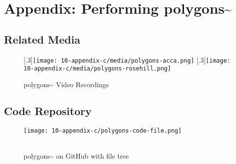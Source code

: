 \chapter{Appendix: Performing polygons\textasciitilde{}}

\section{Related Media}
\begin{figure}[!ht]
    \centering
    [.3\linewidth]{\texttt{[image: 10-appendix-c/media/polygons-acca.png]}}
    \hspace*{2cm}
    [.3\linewidth]{\texttt{[image: 10-appendix-c/media/polygons-rosehill.png]}}
    \caption*{polygons\textasciitilde{} Video Recordings}
\end{figure}
\clearpage


\section{Code Repository}
\begin{figure}[!ht]
    \texttt{[image: 10-appendix-c/polygons-code-file.png]}
    \caption*{ \\ polygons\textasciitilde{} on GitHub with file tree}
\end{figure}
\clearpage









